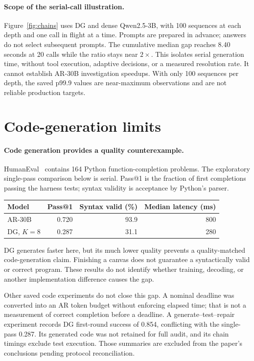 \paragraph{Scope of the serial-call illustration.}
Figure~\ref{fig:chains} uses DG and dense Qwen2.5-3B, with 100 sequences
at each depth and one call in flight at a time. Prompts are prepared in
advance; answers do not select subsequent prompts. The cumulative median
gap reaches 8.40 seconds at 20 calls while the ratio stays near $2\times$.
This isolates serial generation time, without tool execution, adaptive
decisions, or a measured resolution rate. It cannot establish AR-30B
investigation speedups. With only 100 sequences per depth, the saved p99.9
values are near-maximum observations and are not reliable production targets.

\clearpage
\section{Code-generation limits}
\label{app:code_limits}

\paragraph{Code generation provides a quality counterexample.}
HumanEval~\cite{humaneval} contains 164 Python function-completion problems.
The exploratory single-pass comparison below is serial. Pass@1 is the
fraction of first completions passing the harness tests; syntax validity
is acceptance by Python's parser.

\begin{center}
\begin{tabular}{@{}lrrr@{}}
\toprule
Model & Pass@1 & Syntax valid (\%) & Median latency (ms) \\
\midrule
AR-30B & 0.720 & 93.9 & 800 \\
DG, $K=8$ & 0.287 & 31.1 & 280 \\
\bottomrule
\end{tabular}
\end{center}

DG generates faster here, but its much lower quality prevents a
quality-matched code-generation claim. Finishing a canvas does not
guarantee a syntactically valid or correct program. These results do not
identify whether training, decoding, or another implementation difference
causes the gap.

Other saved code experiments do not close this gap. A nominal deadline
was converted into an AR token budget without enforcing elapsed time;
that is not a measurement of correct completion before a deadline.
A generate--test--repair experiment records DG first-round success of
0.854, conflicting with the single-pass 0.287. Its generated code was
not retained for full audit, and its chain timings exclude test execution.
Those summaries are excluded from the paper's conclusions pending
protocol reconciliation.

